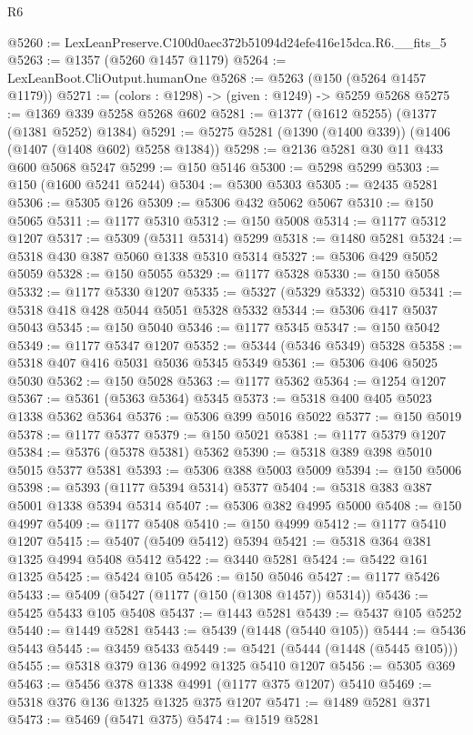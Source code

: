 \begin{lexlean}{R6}
\begin{coremodule}
@5260 := LexLeanPreserve.C100d0aec372b51094d24efe416e15dca.R6.__fits_5
@5263 := @1357 (@5260 @1457 @1179)
@5264 := LexLeanBoot.CliOutput.humanOne
@5268 := @5263 (@150 (@5264 @1457 @1179))
@5271 := (colors : @1298) -> (given : @1249) -> @5259 @5268
@5275 := @1369 @339 @5258 @5268 @602
@5281 := @1377 (@1612 @5255) (@1377 (@1381 @5252) @1384)
@5291 := @5275 @5281 (@1390 (@1400 @339)) (@1406 (@1407 (@1408 @602) @5258 @1384))
@5298 := @2136 @5281 @30 @11 @433 @600 @5068 @5247
@5299 := @150 @5146
@5300 := @5298 @5299
@5303 := @150 (@1600 @5241 @5244)
@5304 := @5300 @5303
@5305 := @2435 @5281
@5306 := @5305 @126
@5309 := @5306 @432 @5062 @5067
@5310 := @150 @5065
@5311 := @1177 @5310
@5312 := @150 @5008
@5314 := @1177 @5312 @1207
@5317 := @5309 (@5311 @5314) @5299
@5318 := @1480 @5281
@5324 := @5318 @430 @387 @5060 @1338 @5310 @5314
@5327 := @5306 @429 @5052 @5059
@5328 := @150 @5055
@5329 := @1177 @5328
@5330 := @150 @5058
@5332 := @1177 @5330 @1207
@5335 := @5327 (@5329 @5332) @5310
@5341 := @5318 @418 @428 @5044 @5051 @5328 @5332
@5344 := @5306 @417 @5037 @5043
@5345 := @150 @5040
@5346 := @1177 @5345
@5347 := @150 @5042
@5349 := @1177 @5347 @1207
@5352 := @5344 (@5346 @5349) @5328
@5358 := @5318 @407 @416 @5031 @5036 @5345 @5349
@5361 := @5306 @406 @5025 @5030
@5362 := @150 @5028
@5363 := @1177 @5362
@5364 := @1254 @1207
@5367 := @5361 (@5363 @5364) @5345
@5373 := @5318 @400 @405 @5023 @1338 @5362 @5364
@5376 := @5306 @399 @5016 @5022
@5377 := @150 @5019
@5378 := @1177 @5377
@5379 := @150 @5021
@5381 := @1177 @5379 @1207
@5384 := @5376 (@5378 @5381) @5362
@5390 := @5318 @389 @398 @5010 @5015 @5377 @5381
@5393 := @5306 @388 @5003 @5009
@5394 := @150 @5006
@5398 := @5393 (@1177 @5394 @5314) @5377
@5404 := @5318 @383 @387 @5001 @1338 @5394 @5314
@5407 := @5306 @382 @4995 @5000
@5408 := @150 @4997
@5409 := @1177 @5408
@5410 := @150 @4999
@5412 := @1177 @5410 @1207
@5415 := @5407 (@5409 @5412) @5394
@5421 := @5318 @364 @381 @1325 @4994 @5408 @5412
@5422 := @3440 @5281
@5424 := @5422 @161 @1325
@5425 := @5424 @105
@5426 := @150 @5046
@5427 := @1177 @5426
@5433 := @5409 (@5427 (@1177 (@150 (@1308 @1457)) @5314))
@5436 := @5425 @5433 @105 @5408
@5437 := @1443 @5281
@5439 := @5437 @105 @5252
@5440 := @1449 @5281
@5443 := @5439 (@1448 (@5440 @105))
@5444 := @5436 @5443
@5445 := @3459 @5433
@5449 := @5421 (@5444 (@1448 (@5445 @105)))
@5455 := @5318 @379 @136 @4992 @1325 @5410 @1207
@5456 := @5305 @369
@5463 := @5456 @378 @1338 @4991 (@1177 @375 @1207) @5410
@5469 := @5318 @376 @136 @1325 @1325 @375 @1207
@5471 := @1489 @5281 @371
@5473 := @5469 (@5471 @375)
@5474 := @1519 @5281

\end{coremodule}
\end{lexlean}
